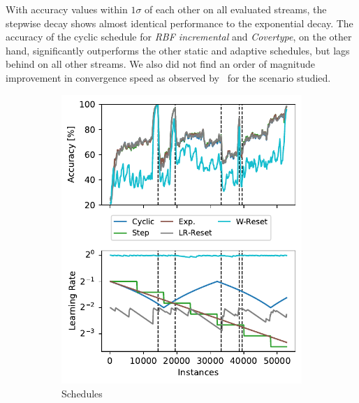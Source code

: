 \documentclass[runningheads]{llncs}
\begin{document}
With accuracy values within $1\sigma$ of each other on all evaluated streams, the stepwise decay shows almost identical performance to the exponential decay.
The accuracy of the cyclic schedule for \textit{RBF incremental} and \textit{Covertype}, on the other hand, significantly outperforms the other static and adaptive schedules, but lags behind on all other streams.
We also did not find an order of magnitude improvement in convergence speed as observed by~\cite{smithSuperConvergenceVeryFast2018a} for the scenario studied.

\def\asize{0.5\textwidth}
\begin{figure}[ht]
	\centering
	\begin{subfigure}[b]{\asize}
		\includegraphics[width=\textwidth]{figures/lr_norms_schedules_insects_abrupt.pdf}
		\caption{Schedules}
		\label{fig:prequential_schedulers_insects}
	\end{subfigure}
	\begin{subfigure}[b]{0.99\textwidth - \asize}

\end{subfigure}
\end{figure}
\end{document}
